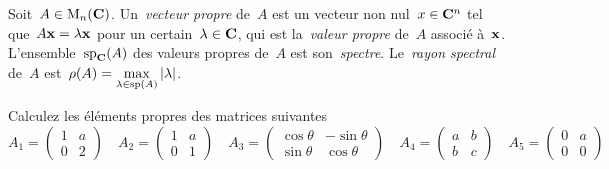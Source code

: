 \begin{definition}
	Soit~$A\in\mathrm{M}_n(\mathbf{C})$.  Un~\emph{vecteur propre} de~$A$ est un vecteur non
	nul~$x\in\mathbf{C}^n$ tel que~$A\mathbf{x}=\lambda\mathbf{x}$ pour un certain~$\lambda\in\mathbf{C}$, qui
	est la~\emph{valeur propre} de~$A$ associé à~$\mathbf{x}$.
	L'ensemble~$\mathrm{sp}_{\mathbf{C}}(A)$ des valeurs propres de~$A$ est
	son~\emph{spectre}.  Le~\emph{rayon spectral} de~$A$
	est~$\displaystyle\rho(A)=\max_{\lambda\in\mathrm{sp}(A)}\left|\lambda\right|$.
\end{definition}

\begin{exercice}
	\label{ex:eigs2x2}
	Calculez les éléments propres des matrices suivantes
	\[
		A_1\!=\!\begin{pmatrix}1&a\\0&2\end{pmatrix}
		\quad
		A_2\!=\!\begin{pmatrix}1&a\\0&1\end{pmatrix}
		\quad
		A_3\!=\!\begin{pmatrix}\cos\theta&-\sin\theta\\\sin\theta&\cos\theta\end{pmatrix}
		\quad
		A_4\!=\!\begin{pmatrix}a&b\\b&c\end{pmatrix}
		\quad
		A_5\!=\!\begin{pmatrix}0&a\\0&0\end{pmatrix}
	\]
\end{exercice}
